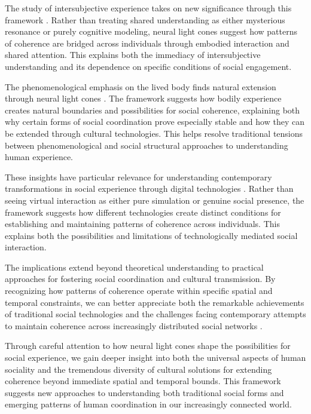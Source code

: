 The study of intersubjective experience takes on new significance through this framework \cite{merleau2012phenomenology}. Rather than treating shared understanding as either mysterious resonance or purely cognitive modeling, neural light cones suggest how patterns of coherence are bridged across individuals through embodied interaction and shared attention. This explains both the immediacy of intersubjective understanding and its dependence on specific conditions of social engagement.

The phenomenological emphasis on the lived body finds natural extension through neural light cones \cite{jackson1989paths}. The framework suggests how bodily experience creates natural boundaries and possibilities for social coherence, explaining both why certain forms of social coordination prove especially stable and how they can be extended through cultural technologies. This helps resolve traditional tensions between phenomenological and social structural approaches to understanding human experience.

These insights have particular relevance for understanding contemporary transformations in social experience through digital technologies \cite{thompson2001radical}. Rather than seeing virtual interaction as either pure simulation or genuine social presence, the framework suggests how different technologies create distinct conditions for establishing and maintaining patterns of coherence across individuals. This explains both the possibilities and limitations of technologically mediated social interaction.

The implications extend beyond theoretical understanding to practical approaches for fostering social coordination and cultural transmission. By recognizing how patterns of coherence operate within specific spatial and temporal constraints, we can better appreciate both the remarkable achievements of traditional social technologies and the challenges facing contemporary attempts to maintain coherence across increasingly distributed social networks \cite{hutchins1995cognition}.

Through careful attention to how neural light cones shape the possibilities for social experience, we gain deeper insight into both the universal aspects of human sociality and the tremendous diversity of cultural solutions for extending coherence beyond immediate spatial and temporal bounds. This framework suggests new approaches to understanding both traditional social forms and emerging patterns of human coordination in our increasingly connected world.